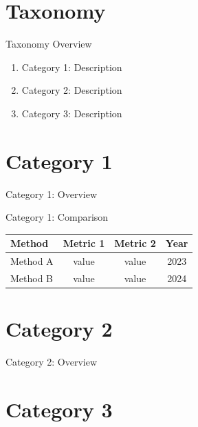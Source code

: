 \documentclass[aspectratio=169]{beamer}
\begin{document}
\section{Taxonomy}

\begin{frame}{Taxonomy Overview}
\begin{enumerate}
  \item Category 1: Description
  \item Category 2: Description
  \item Category 3: Description
\end{enumerate}
\end{frame}

\section{Category 1}

\begin{frame}{Category 1: Overview}
\end{frame}

\begin{frame}{Category 1: Comparison}
\begin{table}
\centering
\footnotesize
\begin{tabular}{lccc}
\toprule
Method & Metric 1 & Metric 2 & Year \\
\midrule
Method A & value & value & 2023 \\
Method B & value & value & 2024 \\
\bottomrule
\end{tabular}
\end{table}
\end{frame}

\section{Category 2}

\begin{frame}{Category 2: Overview}
\end{frame}

\section{Category 3}
\end{document}
